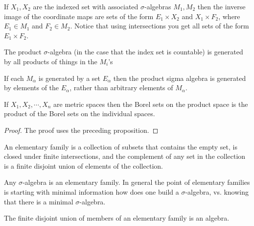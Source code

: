 \begin{example}
If $X_1, X_2$ are the indexed set with associated $\sigma$-algebras $M_1, M_2$ then the inverse image of the coordinate maps are sets of the form $ E_1\times X_2$ and $X_1 \times F_2$, where $E_1 \in M_1$ and $F_2 \in M_2$.  Notice that using intersections you get all sets of the form $E_1 \times F_2$.
\end{example}

\begin{prop} The product $\sigma$-algebra (in the case that the index set is countable) is generated by all products of things in the $M_i$'s
\end{prop}

\begin{prop} If each $M_{\alpha}$ is generated by a set $E_{\alpha}$ then the product sigma algebra is generated by elements of the $E_{\alpha}$, rather than arbitrary elements of $M_{\alpha}$. \end{prop}

\begin{thm} If $X_1, X_2, \cdots, X_n$ are metric spaces then the Borel sets on the product space is the product of the Borel sets on the individual spaces.
\end{thm}

\begin{proof}
The proof uses the preceding proposition.
\end{proof}

\begin{dfn} An elementary family is a collection of subsets that contains the empty set, is closed under finite intersections, and the complement of any set in the collection is a finite disjoint union of elements of the collection. \end{dfn}

\begin{example} Any $ \sigma$-algebra is an elementary family. 
In general the point of elementary families is starting with minimal information how does one build a $\sigma$-algebra, vs. knowing that there is a minimal $\sigma$-algebra.\end{example}

\begin{prop} The finite disjoint union of members of an elementary family is an algebra. \end{prop}
